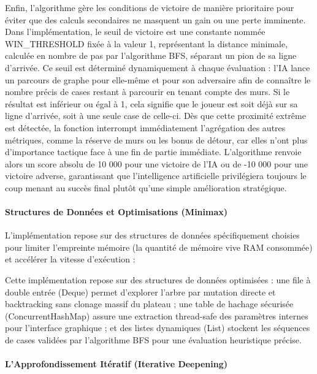 \documentclass[a4paper]{article}
\begin{document}
Enfin, l'algorithme gère les conditions de victoire de manière prioritaire pour éviter que des calculs secondaires ne masquent un gain ou une perte imminente. Dans l'implémentation, le seuil de victoire est une constante nommée WIN\_THRESHOLD fixée à la valeur 1, représentant la distance minimale, calculée en nombre de pas par l'algorithme BFS, séparant un pion de sa ligne d'arrivée. Ce seuil est déterminé dynamiquement à chaque évaluation : l'IA lance un parcours de graphe pour elle-même et pour son adversaire afin de connaître le nombre précis de cases restant à parcourir en tenant compte des murs. Si le résultat est inférieur ou égal à 1, cela signifie que le joueur est soit déjà sur sa ligne d'arrivée, soit à une seule case de celle-ci. Dès que cette proximité extrême est détectée, la fonction interrompt immédiatement l'agrégation des autres métriques, comme la réserve de murs ou les bonus de détour, car elles n'ont plus d'importance tactique face à une fin de partie immédiate. L'algorithme renvoie alors un score absolu de 10 000 pour une victoire de l'IA ou de -10 000 pour une victoire adverse, garantissant que l'intelligence artificielle privilégiera toujours le coup menant au succès final plutôt qu'une simple amélioration stratégique.


\paragraph{Structures de Données et Optimisations (Minimax)}

L'implémentation repose sur des structures de données spécifiquement choisies pour limiter l'empreinte mémoire (la quantité de mémoire vive RAM consommée) et accélérer la vitesse d'exécution :

Cette implémentation repose sur des structures de données optimisées : une file à double entrée (Deque) permet d'explorer l'arbre par mutation directe et backtracking sans clonage massif du plateau ; une table de hachage sécurisée (ConcurrentHashMap) assure une extraction thread-safe des paramètres internes pour l'interface graphique ; et des listes dynamiques (List) stockent les séquences de cases validées par l'algorithme BFS pour une évaluation heuristique précise.

\paragraph{L'Approfondissement Itératif (Iterative Deepening)}
\end{document}
